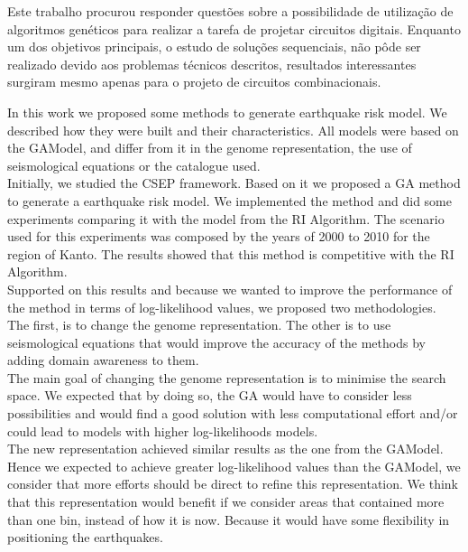 
Este trabalho procurou responder questões sobre a possibilidade de utilização de algoritmos
genéticos para realizar a tarefa de projetar circuitos digitais. Enquanto um
dos objetivos principais, o estudo de soluções sequenciais, não pôde ser realizado devido
aos problemas técnicos descritos, resultados interessantes surgiram mesmo apenas para o
projeto de circuitos combinacionais.

In this work we proposed some methods to generate earthquake risk model. We described how they were built and their characteristics. All models were based on the GAModel, and differ from it in the genome representation, the use of seismological equations or the catalogue used. \\

Initially, we studied the CSEP framework.  Based on it we proposed a GA method to generate a earthquake risk model. We implemented the method and did some experiments comparing it with the model from the RI Algorithm. The scenario used for this experiments was composed by the years of 2000 to 2010 for the region of Kanto. The results showed that this method is competitive with the RI Algorithm.\\

Supported on this results and because we wanted to improve the performance of the method in terms of log-likelihood values, we proposed two methodologies. The first, is to change the genome representation. The other is to use seismological equations that would improve the accuracy of the methods by adding domain awareness to them.\\

The main goal of changing the genome representation is to minimise the search space. We expected that by doing so, the GA would have to consider less possibilities and would find a good solution with less computational effort and/or could lead to models with higher log-likelihoods models.\\

The new representation achieved similar results as the one from the GAModel. Hence we expected to achieve greater log-likelihood values than the GAModel, we consider that more efforts should be direct to refine this representation. We think that this representation would benefit if we consider areas that contained more than one bin, instead of how it is now. Because it would have some flexibility in positioning the earthquakes.\\

